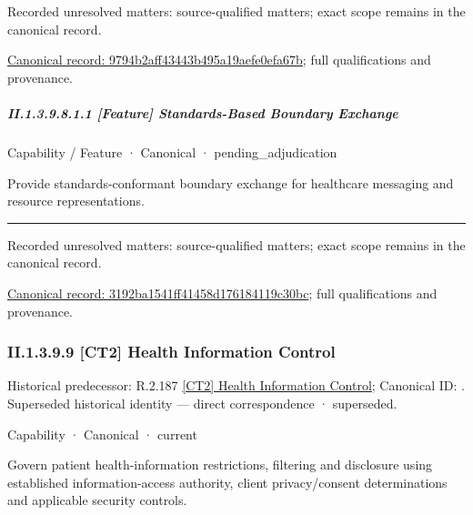 {\small Recorded unresolved matters: source-qualified matters; exact scope remains in the canonical record.}\par
{\footnotesize \href{../../../../../../../continuum/strategy/capability/9794b2aff43443b495a19aefe0efa67b.md}{Canonical record: 9794b2aff43443b495a19aefe0efa67b}; full qualifications and provenance.}\par
\subparagraph*{II.1.3.9.8.1.1 [Feature] Standards-Based Boundary Exchange}
\label{navigation:II.1.3.9.8.1.1}

\label{element:3192ba1541ff41458d176184119c30bc}
{\small Capability / Feature · Canonical · pending\_adjudication}\par

Provide standards-conformant boundary exchange for healthcare messaging and resource representations.



\medskip\hrule\medskip

{\small Recorded unresolved matters: source-qualified matters; exact scope remains in the canonical record.}\par
{\footnotesize \href{../../../../../../../continuum/strategy/capability/feature/3192ba1541ff41458d176184119c30bc.md}{Canonical record: 3192ba1541ff41458d176184119c30bc}; full qualifications and provenance.}\par
\subsubsection*{II.1.3.9.9 [CT2] Health Information Control}
\label{navigation:II.1.3.9.9}

{\small Historical predecessor: R.2.187 \hyperref[element:a3196aef21d443519de874c24f64a185]{[CT2] Health Information Control}; Canonical ID: \texttt{}. Superseded historical identity — direct correspondence · superseded.}\par
\label{element:44cc0e17ad534675bf26dce6e46a68ff}
{\small Capability · Canonical · current}\par

Govern patient health-information restrictions, filtering and disclosure using established information-access authority, client privacy/consent determinations and applicable security controls.



